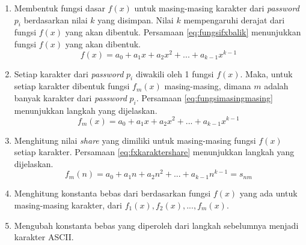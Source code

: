 \begin{enumerate}
	\item Membentuk fungsi dasar \begin{math}f(x)\end{math} untuk masing-masing karakter dari \textit{password} \begin{math}p_i\end{math} berdasarkan nilai \begin{math}k\end{math} yang disimpan. Nilai \begin{math}k\end{math} mempengaruhi derajat dari fungsi \begin{math}f(x)\end{math} yang akan dibentuk. Persamaan \ref{eq:fungsifxbalik} menunjukkan fungsi \begin{math}f(x)\end{math} yang akan dibentuk.
	\begin{equation}
		f(x) = a_0 + a_1x + a_2x^2 + ... + a_{k-1}x^{k-1} \label{eq:fungsifxbalik}
	\end{equation}
	\item Setiap karakter dari \textit{password} \begin{math}p_i\end{math} diwakili oleh 1 fungsi \begin{math}f(x)\end{math}. Maka, untuk setiap karakter dibentuk fungsi \begin{math}f_m(x)\end{math} masing-masing, dimana \begin{math}m\end{math} adalah banyak karakter dari \textit{password} \begin{math}p_i\end{math}. Persamaan \ref{eq:fungsimasingmasing} menunjukkan langkah yang dijelaskan.
	\begin{equation}
		f_m(x) = a_0 + a_1x + a_2x^2 + ... + a_{k-1}x^{k-1} \label{eq:fungsimasingmasing}
	\end{equation}
	\item Menghitung nilai \textit{share} yang dimiliki untuk masing-masing fungsi \begin{math}f(x)\end{math} setiap karakter. Persamaan \ref{eq:fxkaraktershare} menunjukkan langkah yang dijelaskan.
	\begin{equation}
		f_m(n) = a_0 + a_1n + a_2n^2 + ... + a_{k-1}n^{k-1} = s_{nm} \label{eq:fxkaraktershare}
	\end{equation}
	\item Menghitung konstanta bebas dari berdasarkan fungsi \begin{math}f(x)\end{math} yang ada untuk masing-masing karakter, dari \begin{math}f_1(x), f_2(x), ..., f_m(x)\end{math}.
	\item Mengubah konstanta bebas yang diperoleh dari langkah sebelumnya menjadi karakter ASCII.
\end{enumerate}

